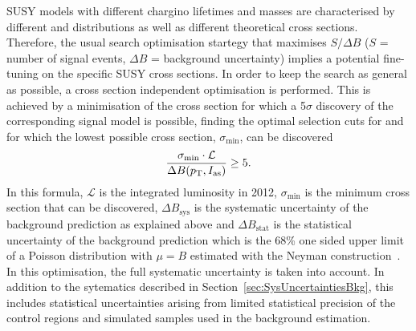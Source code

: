 SUSY models with different chargino lifetimes and masses are characterised by different \pt and \ias distributions as well as different theoretical cross sections.
Therefore, the usual search optimisation startegy that maximises $S/\Delta B$ ($S$ = number of signal events, $\Delta B$ = background uncertainty) implies a potential fine-tuning on the specific SUSY cross sections.
In order to keep the search as general as possible, a cross section independent optimisation is performed.
This is achieved by a minimisation of the cross section for which a 5$\sigma$ discovery of the corresponding signal model is possible, \ie finding the optimal selection cuts for \pt and \ias for which the lowest possible cross section, $\sigma_{\text{min}}$, can be discovered
\begin{equation}
\label{eq:optimisation}
\frac{\sigma_{\text{min}}\cdot \mathcal{L}}{\Delta B (p_{\text{T}}, I_{\text{as}})} \geq 5.
\end{equation} 
In this formula, $\mathcal{L}$ is the integrated luminosity in 2012, $\sigma_{\text{min}}$ is the minimum cross section that can be discovered, $\Delta B_{\text{sys}}$ is the systematic uncertainty of the background prediction as explained above and 
$\Delta B_{\text{stat}}$ is the statistical uncertainty of the background prediction which is the 68\% one sided upper limit of a Poisson distribution with $\mu = B$ estimated with the 
Neyman construction~\cite{bib:Neyman_1937,bib:PDG_2014}.\\
In this optimisation, the full systematic uncertainty is taken into account.
In addition to the sytematics described in Section~\ref{sec:SysUncertaintiesBkg}, this includes statistical uncertainties arising from limited statistical precision of the control regions and simulated samples used in the background estimation.\\

